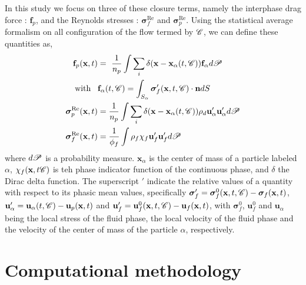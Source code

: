 In this study we focus on three of these closure terms, namely the interphase drag force : $\textbf{f}_p$, and the Reynolds stresses : $\bm{\sigma}^{\text{Re}}_f$ and $\bm{\sigma}^{\text{Re}}_p$. 
Using the statistical average formalism on all configuration of the flow termed by $\mathscr{C}$, we can define these quantities as,  
\begin{align}
    \textbf{f}_p (\textbf{x},t) &= \
    \frac{1}{n_p}\int \sum_i \delta(\textbf{x} - \textbf{x}_\alpha(t,\mathscr{C})) \textbf{f}_\alpha d\mathscr{P}\\
    \label{eq:f_alpha}
    \text{with} \;\;\; &\textbf{f}_\alpha(t,\mathscr{C}) = \int_{S_\alpha} \bm{\sigma}_f'(\textbf{x},t,\mathscr{C}) \cdot \textbf{n} dS \\
    \bm{\sigma}^{\text{Re}}_p(\textbf{x},t) &=\frac{1}{n_p} \int \sum_i \delta(\textbf{x} - \textbf{x}_\alpha(t,\mathscr{C})) \rho_d \textbf{u}_\alpha'\textbf{u}_\alpha' d\mathscr{P}\\
    \label{eq:def_uuc}
    \bm{\sigma}^{\text{Re}}_f(\textbf{x},t) &= \frac{1}{\phi_f}\int \rho_f\chi_f \textbf{u}_f' \textbf{u}_f'd\mathscr{P}
\end{align}
where $d\mathscr{P}$ is a probability measure. 
$\textbf{x}_\alpha$ is the center of mass of a particle labeled $\alpha$, $\chi_f(\textbf{x},t\mathscr{C})$ is teh phase indicator function of the continuous phase, and $\delta$ the Dirac delta function. 
The superscript $'$ indicate the relative values of a quantity with respect to its phasic mean values, specifically $\bm{\sigma}_f' = \bm{\sigma}_f^0(\textbf{x},t, \mathscr{C})  - \bm{\sigma}_f(\textbf{x},t)$, $\textbf{u}_\alpha' = \textbf{u}_\alpha(t,\mathscr{C}) - \textbf{u}_p(\textbf{x},t)$ and $\textbf{u}_f' = \textbf{u}_f^0(\textbf{x},t, \mathscr{C})  -\textbf{u}_f(\textbf{x},t)$, with $\bm{\sigma}_f^0 $, $\textbf{u}_f^0$ and $\textbf{u}_\alpha$ being the local stress of the fluid phase, the local velocity of the fluid phase and the velocity of the center of mass of the particle $\alpha$, respectively. 






\section{Computational methodology}

